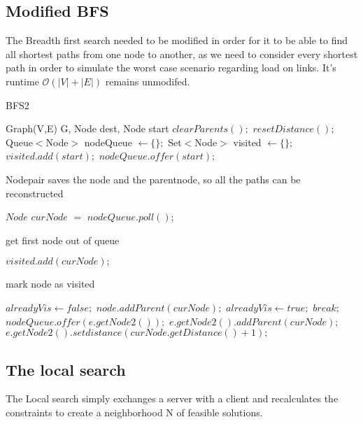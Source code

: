 \documentclass [12pt]{article}
\begin{document}
\subsection{Modified BFS}
The Breadth first search needed to be modified in order for it to be able to find all shortest paths
from one node to another, as we need to consider every shortest path in order to simulate
the worst case scenario regarding load on links. It's runtime $\mathcal O(|V| + |E|)$ remains unmodifed.

\begin{algorithm}[H]
  \caption{BFS2}
  \begin{algorithmic}[2]
    \Require Graph(V,E) G, Node dest, Node start
    \State $clearParents();$
    \State $resetDistance();$
    \State Queue$<$Node$>$ nodeQueue $\gets \{\};$
    \State Set$<$Node$>$ visited $\gets \{\};$
    \State $visited.add(start);$
    \State $nodeQueue.offer(start);$ \Comment \begin{itshape} Nodepair saves the node and the parentnode,
    so all the paths can be reconstructed\end{itshape}
  \State $Node$ $curNode$ $=$ $nodeQueue.poll();$ \Comment \begin{itshape} get first node out of queue\end{itshape}
  \State $visited.add(curNode);$ \Comment \begin{itshape} mark node as visited\end{itshape}            
    \EndIf
    \State $alreadyVis \gets false;$
    \State $node.addParent(curNode);$
    \State $alreadyVis \gets true;$
    \State $break;$
    \EndFor
    \State $nodeQueue.offer(e.getNode2());$
    \State $e.getNode2().addParent(curNode);$
    \State $e.getNode2().setdistance(curNode.getDistance()+1);$
    \EndIf
    \EndIf
    \EndIf
    \EndFor
    \EndWhile



  \end{algorithmic}
\end{algorithm}
\subsection{The local search}
The Local search simply exchanges a server with a client and recalculates the constraints to create a neighborhood N of feasible solutions.
\end{document}

